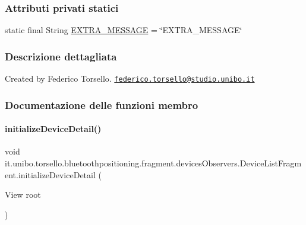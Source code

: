 \subsubsection*{Attributi privati statici}
\begin{DoxyCompactItemize}
\item 
static final String \hyperlink{classit_1_1unibo_1_1torsello_1_1bluetoothpositioning_1_1fragment_1_1devicesObservers_1_1DeviceListFragment_a6ba928c98442b32c8a32eb35b7cecf45_a6ba928c98442b32c8a32eb35b7cecf45}{E\+X\+T\+R\+A\+\_\+\+M\+E\+S\+S\+A\+GE} = \char`\"{}E\+X\+T\+R\+A\+\_\+\+M\+E\+S\+S\+A\+GE\char`\"{}
\end{DoxyCompactItemize}


\subsubsection{Descrizione dettagliata}
Created by Federico Torsello. \href{mailto:federico.torsello@studio.unibo.it}{\tt federico.\+torsello@studio.\+unibo.\+it} 

\subsubsection{Documentazione delle funzioni membro}
\hypertarget{classit_1_1unibo_1_1torsello_1_1bluetoothpositioning_1_1fragment_1_1devicesObservers_1_1DeviceListFragment_a34eb53805cb490013ab68ee251bdf473_a34eb53805cb490013ab68ee251bdf473}{}\label{classit_1_1unibo_1_1torsello_1_1bluetoothpositioning_1_1fragment_1_1devicesObservers_1_1DeviceListFragment_a34eb53805cb490013ab68ee251bdf473_a34eb53805cb490013ab68ee251bdf473} 
\paragraph{\texorpdfstring{initialize\+Device\+Detail()}{initializeDeviceDetail()}}
{\footnotesize\ttfamily void it.\+unibo.\+torsello.\+bluetoothpositioning.\+fragment.\+devices\+Observers.\+Device\+List\+Fragment.\+initialize\+Device\+Detail (\begin{DoxyParamCaption}\item[{View}]{root }\end{DoxyParamCaption})\hspace{0.3cm}{\ttfamily [private]}}



